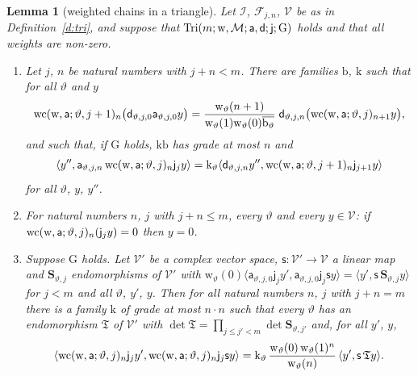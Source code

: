 \documentclass[11pt,a4paper]{article}
\theoremstyle{plainx}
\newtheorem{lemma}[theorem]{Lemma}
\theoremstyle{uprightx}
\newcommand{\cI}{\mathcal{I}}
\newcommand{\cF}{\mathcal{F}}
\newcommand{\cV}{\mathcal{V}}
\newcommand{\cM}{\mathcal{M}}
\newcommand{\ip}[2]{\langle #1,#2\rangle}
\begin{document}
\begin{lemma}[weighted chains in a triangle]\label{l:chain}
Let $\cI$, $\cF_{j,n}$, $\cV$ be as in Definition~\ref{d:tri}, and suppose that
$\IsTriangle{m}{\mathrm{w}}{\cM}{\mathsf{a}}{\mathsf{d}}{\mathsf{j}}{\mathrm{G}}$ holds and that all weights are
non-zero.
\begin{enumerate}[label=\textup{(\alph*)},leftmargin=2.3em,itemsep=1pt]
\item Let $j$, $n$ be natural numbers with $j+n<m$. There are families $\mathrm{b}$, $\mathrm{k}$ such that for all
$\vartheta$ and $y$
\[\operatorname{wc}(\mathrm{w},\mathsf{a};\vartheta,j+1)_n\bigl(\mathsf{d}_{\vartheta,j,0}\mathsf{a}_{\vartheta,j,0}y\bigr)
=\frac{\mathrm{w}_\vartheta(n+1)}{\mathrm{w}_\vartheta(1)\mathrm{w}_\vartheta(0)\overline{\mathrm{b}_{\vartheta}}}\;
\mathsf{d}_{\vartheta,j,n}\bigl(\operatorname{wc}(\mathrm{w},\mathsf{a};\vartheta,j)_{n+1}y\bigr),\]
and such that, if $\mathrm{G}$ holds, $\mathrm{k}\mathrm{b}$ has grade at most $n$ and
\[\ip{y''}{\mathsf{a}_{\vartheta,j,n}\weightedChain{\mathrm{w}}{\mathsf{a}}{\vartheta}{j}_n\mathsf{j}_{j}y}
=\mathrm{k}_{\vartheta}\ip{\mathsf{d}_{\vartheta,j,n}y''}{\weightedChain{\mathrm{w}}{\mathsf{a}}{\vartheta}{j+1}_n\mathsf{j}_{j+1}y}\]
for all $\vartheta$, $y$, $y''$.
\item For natural numbers $n$, $j$ with $j+n\le m$, every $\vartheta$ and every $y\in\cV$: if
$\operatorname{wc}(\mathrm{w},\mathsf{a};\vartheta,j)_n(\mathsf{j}_{j}y)=0$ then $y=0$.
\item Suppose $\mathrm{G}$ holds. Let $\cV'$ be a complex vector space, $\mathsf{s}\colon\cV'\to\cV$ a linear map
and $\mathbf{S}_{\vartheta,j}$ endomorphisms of $\cV'$ with
$\mathrm{w}_\vartheta(0)\ip{\mathsf{a}_{\vartheta,j,0}\mathsf{j}_{j}y'}{\mathsf{a}_{\vartheta,j,0}\mathsf{j}_{j}\mathsf{s}y}=\ip{y'}{\mathsf{s}\,\mathbf{S}_{\vartheta,j}y}$
for $j<m$ and all $\vartheta$, $y'$, $y$. Then for all natural numbers $n$, $j$ with $j+n=m$ there is a family
$\mathrm{k}$ of grade at most $n\cdot n$ such that every $\vartheta$ has an endomorphism $\mathfrak{T}$ of $\cV'$ with
$\det\mathfrak{T}=\prod_{j\le j'<m}\det\mathbf{S}_{\vartheta,j'}$ and, for all $y'$, $y$,
\[\ip{\weightedChain{\mathrm{w}}{\mathsf{a}}{\vartheta}{j}_n\mathsf{j}_{j}y'}{\weightedChain{\mathrm{w}}{\mathsf{a}}{\vartheta}{j}_n\mathsf{j}_{j}\mathsf{s}y}
=\mathrm{k}_{\vartheta}\,\frac{\mathrm{w}_\vartheta(0)\,\mathrm{w}_\vartheta(1)^{n}}{\mathrm{w}_\vartheta(n)}\,\ip{y'}{\mathsf{s}\,\mathfrak{T}y}.\]
\end{enumerate}
\end{lemma}
\end{document}
